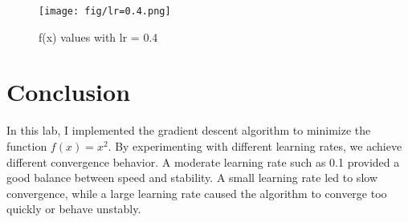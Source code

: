 \documentclass[hidelinks]{report}
\begin{document}
\begin{figure}
    \centering
    \texttt{[image: fig/lr=0.4.png]}
    \caption{f(x) values with lr = 0.4}
    \label{fig:enter-label}
\end{figure}

\chapter{Conclusion}
In this lab, I implemented the gradient descent algorithm to minimize the function $f(x) = x^2$. By experimenting with different learning rates,  we achieve different convergence behavior. A moderate learning rate such as 0.1 provided a good balance between speed and stability. A small learning rate led to slow convergence, while a large learning rate caused the algorithm to converge too quickly or behave unstably. 
\end{document}
